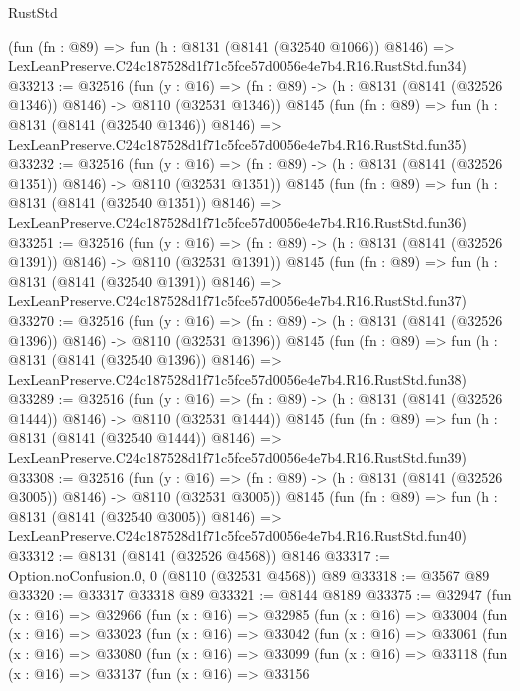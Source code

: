 \begin{lexlean}{RustStd}
\begin{coremodule}
    (fun (fn : @89) =>
    fun (h : @8131 (@8141 (@32540 @1066)) @8146) =>
    LexLeanPreserve.C24c187528d1f71c5fce57d0056e4e7b4.R16.RustStd.fun34)
@33213 := @32516
    (fun (y : @16) =>
    (fn : @89) -> (h : @8131 (@8141 (@32526 @1346)) @8146) -> @8110 (@32531 @1346))
    @8145
    (fun (fn : @89) =>
    fun (h : @8131 (@8141 (@32540 @1346)) @8146) =>
    LexLeanPreserve.C24c187528d1f71c5fce57d0056e4e7b4.R16.RustStd.fun35)
@33232 := @32516
    (fun (y : @16) =>
    (fn : @89) -> (h : @8131 (@8141 (@32526 @1351)) @8146) -> @8110 (@32531 @1351))
    @8145
    (fun (fn : @89) =>
    fun (h : @8131 (@8141 (@32540 @1351)) @8146) =>
    LexLeanPreserve.C24c187528d1f71c5fce57d0056e4e7b4.R16.RustStd.fun36)
@33251 := @32516
    (fun (y : @16) =>
    (fn : @89) -> (h : @8131 (@8141 (@32526 @1391)) @8146) -> @8110 (@32531 @1391))
    @8145
    (fun (fn : @89) =>
    fun (h : @8131 (@8141 (@32540 @1391)) @8146) =>
    LexLeanPreserve.C24c187528d1f71c5fce57d0056e4e7b4.R16.RustStd.fun37)
@33270 := @32516
    (fun (y : @16) =>
    (fn : @89) -> (h : @8131 (@8141 (@32526 @1396)) @8146) -> @8110 (@32531 @1396))
    @8145
    (fun (fn : @89) =>
    fun (h : @8131 (@8141 (@32540 @1396)) @8146) =>
    LexLeanPreserve.C24c187528d1f71c5fce57d0056e4e7b4.R16.RustStd.fun38)
@33289 := @32516
    (fun (y : @16) =>
    (fn : @89) -> (h : @8131 (@8141 (@32526 @1444)) @8146) -> @8110 (@32531 @1444))
    @8145
    (fun (fn : @89) =>
    fun (h : @8131 (@8141 (@32540 @1444)) @8146) =>
    LexLeanPreserve.C24c187528d1f71c5fce57d0056e4e7b4.R16.RustStd.fun39)
@33308 := @32516
    (fun (y : @16) =>
    (fn : @89) -> (h : @8131 (@8141 (@32526 @3005)) @8146) -> @8110 (@32531 @3005))
    @8145
    (fun (fn : @89) =>
    fun (h : @8131 (@8141 (@32540 @3005)) @8146) =>
    LexLeanPreserve.C24c187528d1f71c5fce57d0056e4e7b4.R16.RustStd.fun40)
@33312 := @8131 (@8141 (@32526 @4568)) @8146
@33317 := Option.noConfusion.{0, 0} (@8110 (@32531 @4568)) @89
@33318 := @3567 @89
@33320 := @33317 @33318 @89
@33321 := @8144 @8189
@33375 := @32947
    (fun (x : @16) =>
    @32966
      (fun (x : @16) =>
      @32985
        (fun (x : @16) =>
        @33004
          (fun (x : @16) =>
          @33023
            (fun (x : @16) =>
            @33042
              (fun (x : @16) =>
              @33061
                (fun (x : @16) =>
                @33080
                  (fun (x : @16) =>
                  @33099
                    (fun (x : @16) =>
                    @33118
                      (fun (x : @16) =>
                      @33137
                        (fun (x : @16) =>
                        @33156

\end{coremodule}
\end{lexlean}
